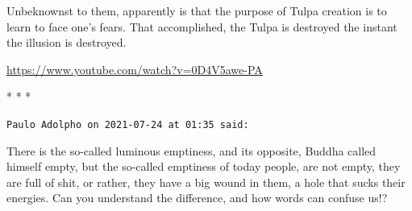 Unbeknownst to them, apparently is that the purpose of Tulpa creation is to learn to face one's fears. That accomplished, the Tulpa is destroyed the instant the illusion is destroyed.

\url{https://www.youtube.com/watch?v=0D4V5awe-PA}


\begin{center}* * *\end{center}

\begin{footnotesize}
\begin{sffamily}
\texttt{Paulo Adolpho on 2021-07-24 at 01:35 said:}

There is the so-called luminous emptiness, and its opposite, Buddha called himself empty, but the so-called emptiness of today people, are not empty, they are full of shit, or rather, they have a big wound in them, a hole that sucks their energies. Can you understand the difference, and how words can confuse us!?


\hfill

\end{sffamily}
\end{footnotesize}

